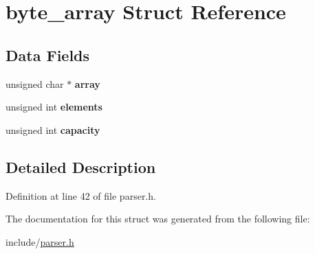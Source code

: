 \hypertarget{structbyte__array}{}\section{byte\+\_\+array Struct Reference}
\label{structbyte__array}
\subsection*{Data Fields}
\begin{DoxyCompactItemize}
\item 
\mbox{\label{structbyte__array_a5b7c2def64e97abe776ceb128f551287}} 
unsigned char $\ast$ {\bfseries array}
\item 
\mbox{\label{structbyte__array_a8879518cee670218be2c0fce6e690308}} 
unsigned int {\bfseries elements}
\item 
\mbox{\label{structbyte__array_a7475659306b472c21517dcceb560c904}} 
unsigned int {\bfseries capacity}
\end{DoxyCompactItemize}


\subsection{Detailed Description}


Definition at line 42 of file parser.\+h.



The documentation for this struct was generated from the following file\+:\begin{DoxyCompactItemize}
\item 
include/\hyperlink{parser_8h}{parser.\+h}\end{DoxyCompactItemize}
